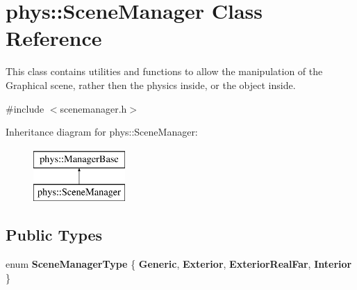 \hypertarget{classphys_1_1SceneManager}{
\section{phys::SceneManager Class Reference}
\label{dd/da8/classphys_1_1SceneManager}
}


This class contains utilities and functions to allow the manipulation of the Graphical scene, rather then the physics inside, or the object inside.  




{\ttfamily \#include $<$scenemanager.h$>$}

Inheritance diagram for phys::SceneManager:\begin{figure}[H]
\begin{center}
\leavevmode
\includegraphics[height=2cm]{dd/da8/classphys_1_1SceneManager}
\end{center}
\end{figure}
\subsection*{Public Types}
\begin{DoxyCompactItemize}
\item 
enum {\bfseries SceneManagerType} \{ {\bfseries Generic}, 
{\bfseries Exterior}, 
{\bfseries ExteriorRealFar}, 
{\bfseries Interior}
 \}
\end{DoxyCompactItemize}

